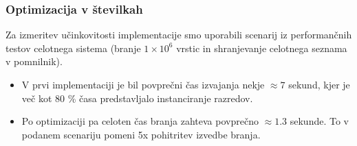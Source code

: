 \documentclass[a4paper,12pt,openright]{book}
\begin{document}
        \subsubsection{Optimizacija v številkah}
        Za izmeritev učinkovitosti implementacije smo uporabili scenarij iz performančnih testov celotnega sistema (branje $1 \times 10^6$ vrstic in shranjevanje celotnega seznama v pomnilnik).
        \begin{itemize}
            \item V prvi implementaciji je bil povprečni čas izvajanja nekje $\approx 7$ sekund, kjer je več kot $80$ \% časa predstavljalo instanciranje razredov.
            \item Po optimizaciji pa celoten čas branja zahteva povprečno $\approx 1.3$ sekunde. To v podanem scenariju pomeni 5x pohitritev izvedbe branja.
        \end{itemize}
\end{document}
